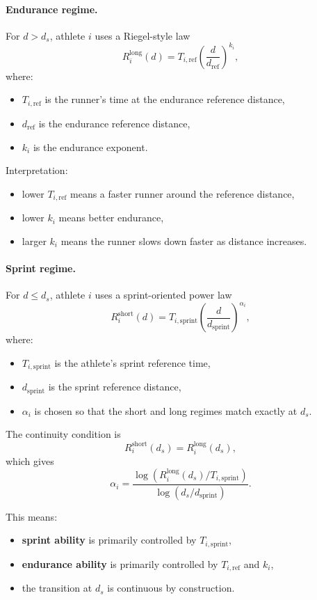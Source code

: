 \documentclass[11pt]{article}
\begin{document}
\paragraph{Endurance regime.}
For $d > d_s$, athlete $i$ uses a Riegel-style law
\[
R_i^{\text{long}}(d) = T_{i,\mathrm{ref}} \left(\frac{d}{d_{\mathrm{ref}}}\right)^{k_i},
\]
where:
\begin{itemize}
    \item $T_{i,\mathrm{ref}}$ is the runner's time at the endurance reference distance,
    \item $d_{\mathrm{ref}}$ is the endurance reference distance,
    \item $k_i$ is the endurance exponent.
\end{itemize}

Interpretation:
\begin{itemize}
    \item lower $T_{i,\mathrm{ref}}$ means a faster runner around the reference distance,
    \item lower $k_i$ means better endurance,
    \item larger $k_i$ means the runner slows down faster as distance increases.
\end{itemize}

\paragraph{Sprint regime.}
For $d \leq d_s$, athlete $i$ uses a sprint-oriented power law
\[
R_i^{\text{short}}(d) = T_{i,\mathrm{sprint}} \left(\frac{d}{d_{\mathrm{sprint}}}\right)^{\alpha_i},
\]
where:
\begin{itemize}
    \item $T_{i,\mathrm{sprint}}$ is the athlete's sprint reference time,
    \item $d_{\mathrm{sprint}}$ is the sprint reference distance,
    \item $\alpha_i$ is chosen so that the short and long regimes match exactly at $d_s$.
\end{itemize}

The continuity condition is
\[
R_i^{\text{short}}(d_s) = R_i^{\text{long}}(d_s),
\]
which gives
\[
\alpha_i
=
\frac{
\log\!\left(R_i^{\text{long}}(d_s) / T_{i,\mathrm{sprint}}\right)
}{
\log\!\left(d_s / d_{\mathrm{sprint}}\right)
}.
\]

This means:
\begin{itemize}
    \item \textbf{sprint ability} is primarily controlled by $T_{i,\mathrm{sprint}}$,
    \item \textbf{endurance ability} is primarily controlled by $T_{i,\mathrm{ref}}$ and $k_i$,
    \item the transition at $d_s$ is continuous by construction.
\end{itemize}
\end{document}
